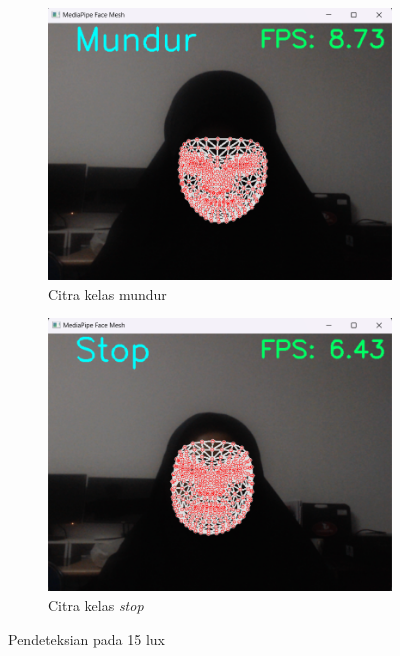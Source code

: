 \begin{figure}[H]
  \begin{subfigure}{0.3\textwidth}
      \centering
      \includegraphics[width=\linewidth]{gambar/15 mundur.png}
      \caption{Citra kelas mundur}
      \label{fig:image4}
  \end{subfigure}
  \hfill
  \begin{subfigure}{0.3\textwidth}
      \centering
      \includegraphics[width=\linewidth]{gambar/15 stop.png}
      \caption{Citra kelas \emph{stop}}
      \label{fig:image5}
  \end{subfigure}
  \caption{Pendeteksian pada 15 lux}
  \label{fig:15lux}
\end{figure}

